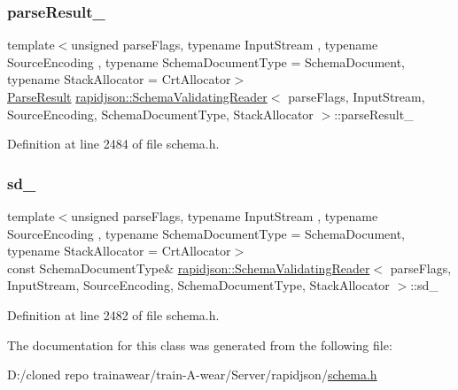 \subsubsection{\texorpdfstring{parseResult\_}{parseResult\_}}
{\footnotesize\ttfamily template$<$unsigned parse\+Flags, typename Input\+Stream , typename Source\+Encoding , typename Schema\+Document\+Type  = Schema\+Document, typename Stack\+Allocator  = Crt\+Allocator$>$ \\
\mbox{\hyperlink{structrapidjson_1_1_parse_result}{Parse\+Result}} \mbox{\hyperlink{classrapidjson_1_1_schema_validating_reader}{rapidjson\+::\+Schema\+Validating\+Reader}}$<$ parse\+Flags, Input\+Stream, Source\+Encoding, Schema\+Document\+Type, Stack\+Allocator $>$\+::parse\+Result\+\_\+\hspace{0.3cm}{\ttfamily [private]}}



Definition at line 2484 of file schema.\+h.

\mbox{\label{classrapidjson_1_1_schema_validating_reader_ac8ff3d5618d18af30ccce4b85155e0bf}} 
\subsubsection{\texorpdfstring{sd\_}{sd\_}}
{\footnotesize\ttfamily template$<$unsigned parse\+Flags, typename Input\+Stream , typename Source\+Encoding , typename Schema\+Document\+Type  = Schema\+Document, typename Stack\+Allocator  = Crt\+Allocator$>$ \\
const Schema\+Document\+Type\& \mbox{\hyperlink{classrapidjson_1_1_schema_validating_reader}{rapidjson\+::\+Schema\+Validating\+Reader}}$<$ parse\+Flags, Input\+Stream, Source\+Encoding, Schema\+Document\+Type, Stack\+Allocator $>$\+::sd\+\_\+\hspace{0.3cm}{\ttfamily [private]}}



Definition at line 2482 of file schema.\+h.



The documentation for this class was generated from the following file\+:\begin{DoxyCompactItemize}
\item 
D\+:/cloned repo trainawear/train-\/\+A-\/wear/\+Server/rapidjson/\mbox{\hyperlink{schema_8h}{schema.\+h}}\end{DoxyCompactItemize}
